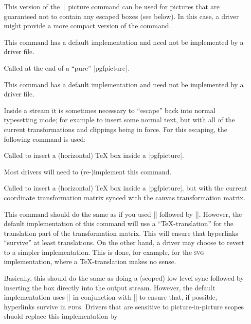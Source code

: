 \begin{command}{\pgfsys@beginpurepicture}
  This version of the |\pgfsys@beginpicture| picture command can be
  used for pictures that are guaranteed not to contain any escaped
  boxes (see below). In this case, a driver might provide a more
  compact version of the command.

  This command has a default implementation and need not be
  implemented by a driver file.
\end{command}

\begin{command}{\pgfsys@endpurepicture}
  Called at the end of a ``pure'' |{pgfpicture}|.

  This command has a default implementation and need not be
  implemented by a driver file.
\end{command}

Inside a stream it is sometimes necessary to ``escape'' back into
normal typesetting mode; for example to insert some normal text, but
with all of the current transformations and clippings being in
force. For this escaping, the following command is used:

\begin{command}{\pgfsys@hbox{}}
  Called to insert a (horizontal) TeX box inside a
  |{pgfpicture}|.

  Most drivers will need to (re-)implement this command.
\end{command}

\begin{command}{\pgfsys@hboxsynced{}}
  Called to insert a (horizontal) TeX box inside a
  |{pgfpicture}|, but with the current coordinate transformation
  matrix synced with the canvas transformation matrix.

  This command should do the same as if you used
  |\pgflowlevelsynccm| followed by |\pgfsys@hbox|. However, the default
  implementation of this command will use a ``TeX-translation'' for
  the translation part of the transformation matrix. This will ensure
  that hyperlinks ``survive'' at least translations. On the other
  hand, a driver may choose to revert to a simpler
  implementation. This is done, for example, for the \textsc{svg}
  implementation, where a \TeX-translation makes no sense.
\end{command}

\begin{command}{\pgfsys@pictureboxsynced{}}
  Basically, this should do the same as doing a (scoped) low level sync
  followed by inserting the box  directly into the
  output stream. However, the default implementation uses
  |\pgfsys@hboxsynced| in conjunction with |\pgfsys@beginpicture| to
  ensure that, if possible, hyperlinks survive in
  \textsc{pdf}s. Drivers that are sensitive to picture-in-picture
  scopes shuold replace this implementation by
\end{command}



